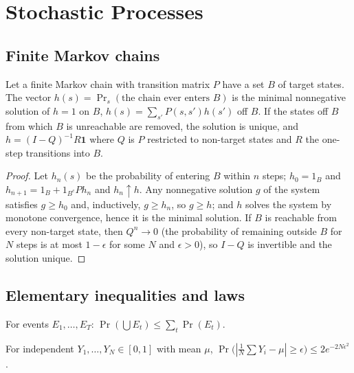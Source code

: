 \chapter{Stochastic Processes}\label{app:stoch}

\section{Finite Markov chains}

\begin{newresult}\label{f:hit}
Let a finite Markov chain with transition matrix $P$ have a set $B$ of target states. The vector $h(s)=\Pr_s(\text{the chain ever enters }B)$ is the minimal nonnegative solution of $h=1$ on $B$, $h(s)=\sum_{s'}P(s,s')h(s')$ off $B$. If the states off $B$ from which $B$ is unreachable are removed, the solution is unique, and $h=(I-Q)^{-1}R\mathbf 1$ where $Q$ is $P$ restricted to non-target states and $R$ the one-step transitions into $B$.
\end{newresult}
\begin{proof}
Let $h_n(s)$ be the probability of entering $B$ within $n$ steps; $h_0=1_B$ and $h_{n+1}=1_B+1_{B^c}Ph_n$ and $h_n\uparrow h$. Any nonnegative solution $g$ of the system satisfies $g\ge h_0$ and, inductively, $g\ge h_n$, so $g\ge h$; and $h$ solves the system by monotone convergence, hence it is the minimal solution. If $B$ is reachable from every non-target state, then $Q^n\to0$ (the probability of remaining outside $B$ for $N$ steps is at most $1-\epsilon$ for some $N$ and $\epsilon>0$), so $I-Q$ is invertible and the solution unique.
\end{proof}

\section{Elementary inequalities and laws}

\begin{established}\label{f:boole}
For events $E_1,\dots,E_T$: $\Pr(\bigcup E_t)\le\sum_t\Pr(E_t)$.
\end{established}

\begin{established}\label{f:hoeffding}
For independent $Y_1,\dots,Y_N\in[0,1]$ with mean $\mu$, $\Pr\bigl(|\tfrac1N\sum Y_i-\mu|\ge\epsilon\bigr)\le2e^{-2N\epsilon^2}$.
\end{established}

